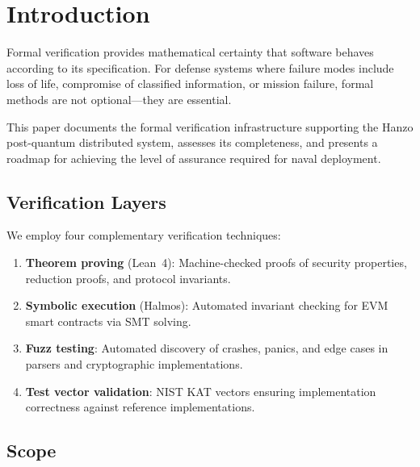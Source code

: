 \documentclass[11pt,letterpaper]{article}
\begin{document}
\section{Introduction}

Formal verification provides mathematical certainty that software behaves according to its specification. For defense systems where failure modes include loss of life, compromise of classified information, or mission failure, formal methods are not optional---they are essential.

This paper documents the formal verification infrastructure supporting the Hanzo post-quantum distributed system, assesses its completeness, and presents a roadmap for achieving the level of assurance required for naval deployment.

\subsection{Verification Layers}

We employ four complementary verification techniques:

\begin{enumerate}
\item \textbf{Theorem proving} (Lean~4): Machine-checked proofs of security properties, reduction proofs, and protocol invariants.
\item \textbf{Symbolic execution} (Halmos): Automated invariant checking for EVM smart contracts via SMT solving.
\item \textbf{Fuzz testing}: Automated discovery of crashes, panics, and edge cases in parsers and cryptographic implementations.
\item \textbf{Test vector validation}: NIST KAT vectors ensuring implementation correctness against reference implementations.
\end{enumerate}

\subsection{Scope}
\end{document}
